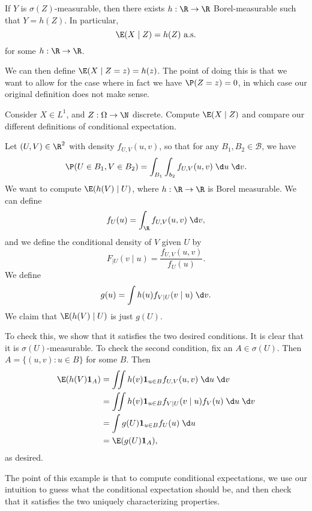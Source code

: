 \documentclass[a4paper]{article}
\begin{document}
\begin{lemma}
  If $Y$ is $\sigma(Z)$-measurable, then there exists $h: \R \to \R$ Borel-measurable such that $Y = h(Z)$. In particular,
  \[
    \E(X \mid Z) = h(Z) \text{ a.s.}
  \]
  for some $h: \R \to \R$.
\end{lemma}
We can then define $\E(X \mid Z = z) = h(z)$. The point of doing this is that we want to allow for the case where in fact we have $\P(Z = z) = 0$, in which case our original definition does not make sense.

\begin{ex}
  Consider $X \in L^1$, and $Z: \Omega \to \N$ discrete. Compute $\E(X \mid Z)$ and compare our different definitions of conditional expectation.
\end{ex}

\begin{eg}
  Let $(U, V) \in \R^2$ with density $f_{U, V}(u, v)$, so that for any $B_1, B_2 \in \mathcal{B}$, we have
  \[
    \P(U \in B_1, V \in B_2) = \int_{B_1} \int_{b_2} f_{U, V}(u, v) \;\d u \;\d v.
  \]
  We want to compute $\E(h(V) \mid U)$, where $h: \R \to \R$ is Borel measurable. We can define
  \[
    f_U(u) = \int_\R f_{U, V} (u, v) \;\d v,
  \]
  and we define the conditional density of $V$ given $U$ by
  \[
    F_{ \mid U} (v \mid u) = \frac{f_{U, V}(u, v)}{f_U(u)}.
  \]
  We define
  \[
    g(u) = \int h(u) f_{V \mid U} (v \mid u)\;\d v.
  \]
  We claim that $\E(h(V) \mid U)$ is just $g(U)$.

  To check this, we show that it satisfies the two desired conditions. It is clear that it is $\sigma(U)$-measurable. To check the second condition, fix an $A \in \sigma(U)$. Then $A = \{(u, v): u \in B\}$ for some $B$. Then
  \begin{align*}
    \E(h(V) \mathbf{1}_A) &= \iint h(v) \mathbf{1}_{u \in B} f_{U, V} (u, v)\;\d u\;\d v\\
    &= \iint h(v) \mathbf{1}_{u \in B} f_{V \mid U}(v \mid u) f_V(u)\;\d u\;\d v\\
    &= \int g(U) \mathbf{1}_{u \in B} f_U(u) \;\d u\\
    &= \E(g(U) \mathbf{1}_A),
  \end{align*}
  as desired.
\end{eg}
The point of this example is that to compute conditional expectations, we use our intuition to guess what the conditional expectation should be, and then check that it satisfies the two uniquely characterizing properties.
\end{document}
